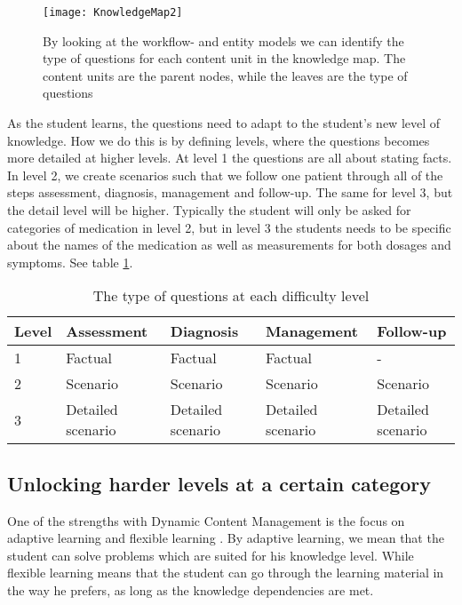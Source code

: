 \begin{figure}[h!]
	\texttt{[image: KnowledgeMap2]}
	\caption {By looking at the workflow- and entity models we can identify the type of questions for each content unit in the knowledge map. The content units are the parent nodes, while the leaves are the type of questions}
	\label{fig:ExpandedKnowledgeMap}
\end{figure}

As the student learns, the questions need to adapt to the student's new level of knowledge. How we do this is by defining levels, where the questions becomes more detailed at higher levels. At level 1 the questions are all about stating facts. In level 2, we create scenarios such that we follow one patient through all of the steps assessment, diagnosis, management and follow-up. The same for level 3, but the detail level will be higher. Typically the student will only be asked for categories of medication in level 2, but in level 3 the students needs to be specific about the names of the medication as well as measurements for both dosages and symptoms. See table \ref{table:ProgressionGranularity}.

\begin{table}[h!]	
	\begin{tabular}{|m{2em}|m{6em}|m{6em}|m{6em}|m{6em}|}
		\hline
		Level & Assessment & Diagnosis & Management & Follow-up \\
		\hline
		1  & Factual & Factual & Factual & - \\
		2 & Scenario & Scenario & Scenario & Scenario \\
		3 & Detailed scenario  & Detailed scenario & Detailed scenario & Detailed scenario \\
		\hline
	\end{tabular}
\caption{The type of questions at each difficulty level}
\label{table:ProgressionGranularity}
\end{table}




\subsection{Unlocking harder levels at a certain category}
One of the strengths with Dynamic Content Management is the focus on adaptive learning and flexible learning \parencite{Eide2008}. By adaptive learning, we mean that the student can solve problems which are suited for his knowledge level. While flexible learning means that the student can go through the learning material in the way he prefers, as long as the knowledge dependencies are met.

